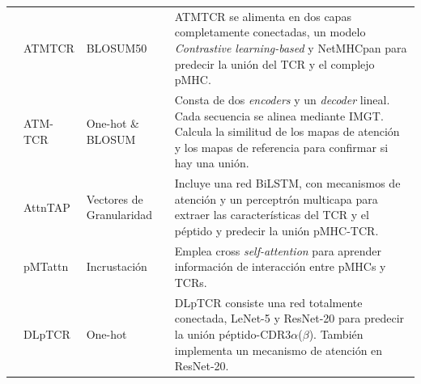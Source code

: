 \begin{table}[h]
{\begin{scriptsize}
\begin{tabular}{p{2.5cm}p{2.5cm}p{2cm}p{5.5cm}}
			\cite{fang2022attention}	&	ATMTCR	&	BLOSUM50	&	ATMTCR se alimenta en dos capas completamente conectadas, un modelo \textit{Contrastive learning-based} y NetMHCpan para predecir la unión del TCR y el complejo pMHC.
			\\
			
			\cite{cai2022atm}	&	ATM-TCR	&	One-hot	\& BLOSUM &	Consta de dos \textit{encoders} y un \textit{decoder} lineal. %
			Cada secuencia se alinea mediante IMGT. Calcula la similitud de los mapas de atención y los mapas de referencia para confirmar si hay una unión.\\
			
			\cite{xu2022attntap}	&	AttnTAP	& Vectores de Granularidad	&	Incluye una red BiLSTM, con mecanismos de atención y un perceptrón multicapa para extraer las características del TCR y el péptido y predecir la unión pMHC-TCR.\\
			
			
			\cite{9994875}	&	pMTattn	&	Incrustación	&	Emplea cross \textit{self-attention} para aprender información de interacción entre pMHCs y TCRs. 
			\\
			
			\cite{xu2021dlptcr}	&	DLpTCR	&	One-hot	&    DLpTCR consiste una red totalmente conectada, LeNet-5 y ResNet-20 para predecir la unión péptido-CDR3$\alpha$($\beta$). También implementa un mecanismo de atención en ResNet-20.%
			\\
			
		
			
			
			
			
			
			
		\end{tabular}
		\end{scriptsize}
}
\end{table}

